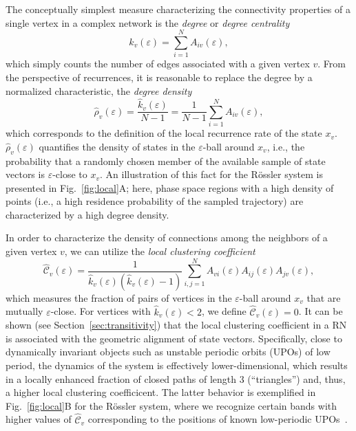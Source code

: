 The conceptually simplest measure characterizing the connectivity properties of a single vertex in a complex network is the \textit{degree} or \textit{degree centrality}
\begin{equation}
\hat{k}_v(\varepsilon)=\sum_{i=1}^N A_{iv}(\varepsilon),
\label{eq:degree}
\end{equation}
\noindent
which simply counts the number of edges associated with a given vertex $v$. From the perspective of recurrences, it is reasonable to replace the degree by a normalized characteristic, the \textit{degree density}
\begin{equation}
\hat{\rho}_v(\varepsilon)=\frac{\hat{k}_v(\varepsilon)}{N-1}=\frac{1}{N-1} \sum_{i=1}^N A_{iv}(\varepsilon),
\label{eq:locrho}
\end{equation}
\noindent
which corresponds to the definition of the local recurrence rate of the state $x_v$. $\hat{\rho}_v(\varepsilon)$ quantifies the density of states in the $\varepsilon$-ball around $x_v$, i.e., the probability that a randomly chosen member of the available sample of state vectors is $\varepsilon$-close to $x_v$. An illustration of this fact for the R\"ossler system is presented in Fig.~\ref{fig:local}A; here, phase space regions with a high density of points (i.e., a high residence probability of the sampled trajectory) are characterized by a high degree density.

In order to characterize the density of connections among the neighbors of a given vertex $v$, we can utilize the \textit{local clustering coefficient}
\begin{equation}
\hat{\mathcal{C}}_v(\varepsilon)=\frac{1}{\hat{k}_v(\varepsilon)(\hat{k}_v(\varepsilon)-1)} \sum_{i,j=1}^N A_{vi}(\varepsilon) A_{ij}(\varepsilon) A_{jv}(\varepsilon),
\label{eq:locclustering}
\end{equation}
\noindent
which measures the fraction of pairs of vertices in the $\varepsilon$-ball around $x_v$ that are
mutually $\varepsilon$-close. For vertices with $\hat{k}_v(\varepsilon)<2$, we define $\hat{\mathcal{C}}_v(\varepsilon)=0$. It can be shown (see Section~\ref{sec:transitivity}) that the local clustering coefficient in a RN is associated with the geometric alignment of state vectors. Specifically, close to dynamically invariant objects such as unstable periodic orbits (UPOs) of low period, the dynamics of the system is effectively lower-dimensional, which results in a locally enhanced fraction of closed paths of length 3 (``triangles'') and, thus, a higher local clustering coefficicent. The latter behavior is exemplified in Fig.~\ref{fig:local}B for the R\"ossler system, where we recognize certain bands with higher values of $\hat{\mathcal{C}}_v$ corresponding to the positions of known low-periodic UPOs~\cite{Donner2010a}.

